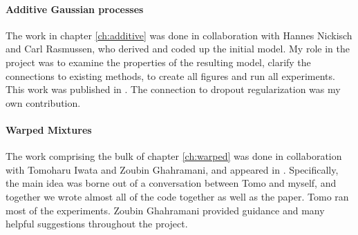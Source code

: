 \paragraph{Additive Gaussian processes}
The work in chapter \ref{ch:additive} was done in collaboration with Hannes Nickisch and Carl Rasmussen, who derived and coded up the initial model.
My role in the project was to examine the properties of the resulting model, clarify the connections to existing methods, to create all figures and run all experiments.
This work was published in \citep{duvenaud2011additive11}.
The connection to dropout regularization was my own contribution.

\paragraph{Warped Mixtures}
The work comprising the bulk of chapter \ref{ch:warped} was done in collaboration with Tomoharu Iwata and Zoubin Ghahramani, and appeared in \citep{IwaDuvGha12}.
Specifically, the main idea was borne out of a conversation between Tomo and myself, and together we wrote almost all of the code together as well as the paper.
Tomo ran most of the experiments.
Zoubin Ghahramani provided guidance and many helpful suggestions throughout the project.



\outbpdocument{


}


